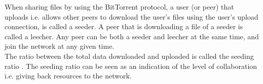 When sharing files by using the BitTorrent protocol, a user (or peer) that uploads i.e. allows other peers to download the user's files using the user's upload connection, is called a seeder.
A peer that is downloading a file of a seeder is called a leecher.
Any peer can be both a seeder and leecher at the same time, and join the network at any given time.\\

The ratio between the total data downloaded and uploaded is called the seeding ratio \cite{Cohen-bittorrent}.
The seeding ratio can be seen as an indication of the level of collaboration i.e. giving back resources to the network.\\




